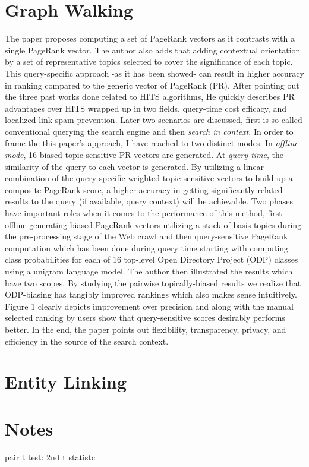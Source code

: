 \documentclass[letterpaper,12pt]{article}
\begin{document}
\section{Graph Walking}
The paper proposes computing a set of PageRank vectors as it contrasts with a single PageRank vector. The author also adds that adding contextual orientation by a set of representative topics selected to cover the significance of each topic. This query-specific approach -as it has been showed- can result in higher accuracy in ranking compared to the generic vector of PageRank (PR). After pointing out the three past works done related to HITS algorithms, He quickly describes PR advantages over HITS wrapped up in two fields, query-time cost efficacy, and localized link spam prevention. Later two scenarios are discussed, first is so-called conventional querying the search engine and then \textit{search in context}. In order to frame the this paper's approach, I have reached to two distinct modes. In \textit{offline mode}, 16 biased topic-sensitive PR vectors are generated. At \textit{query time}, the similarity of the query to each vector is generated. By utilizing a linear combination of the query-specific weighted topic-sensitive vectors to build up a composite PageRank score, a higher accuracy in getting significantly related results to the query (if available, query context) will be achievable. Two phases have important roles when it comes to the performance of this method, first offline generating biased PageRank vectors utilizing a stack of basis topics during the pre-processing stage of the Web crawl and then query-sensitive PageRank computation which has been done during query time starting with computing class probabilities for each of 16 top-level Open Directory Project (ODP) classes using a unigram language model. The author then illustrated the results which have two scopes. By studying the pairwise topically-biased results we realize that ODP-biasing has tangibly improved rankings which also makes sense intuitively. Figure 1 clearly depicts improvement over precision and along with the manual selected ranking by users show that query-sensitive scores desirably performs better. In the end, the paper points out flexibility, transparency, privacy, and efficiency in the source of the search context.

\section{Entity Linking}


\section{Notes}
pair t test: 
2nd t statistc
\end{document}

